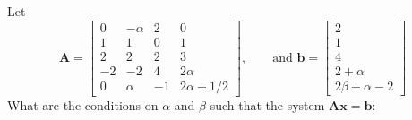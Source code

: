 \documentclass[11pt]{scrartcl}
\begin{document}
\section{}
Let
\begin{equation}
	\mathbf{A} = \left [ \begin{array}{cccc}
			0  & - \alpha & 2  & 0             \\
			1  & 1        & 0  & 1             \\
			2  & 2        & 2  & 3             \\
			-2 & -2       & 4  & 2\alpha       \\
			0  & \alpha   & -1 & 2\alpha + 1/2
		\end{array} \right ], \qquad  \mbox{and }
	\mathbf{b} =  \left [ \begin{array}{c}
			2          \\
			1          \\
			4          \\
			2 + \alpha \\
			2 \beta + \alpha -2
		\end{array} \right ]
\end{equation}
What are the conditions on $\alpha$ and $\beta$ such that the system $\mathbf{A} \mathbf{x} = \mathbf{b}$:
\end{document}
